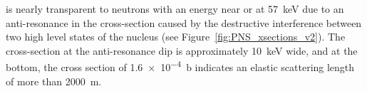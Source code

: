 



 is nearly transparent to neutrons with an energy near or at \SI{57}{\keV} due to an anti-resonance in the cross-section caused by the destructive interference between two high level states of the  nucleus (see Figure~\ref{fig:PNS_xsections_v2}). The cross-section at the anti-resonance dip is approximately \SI{10}{\keV} wide, and at the bottom, the cross section of \SI{1.6e-4}{\barn} indicates an elastic scattering length of more than \SI{2000}{\m}. %

